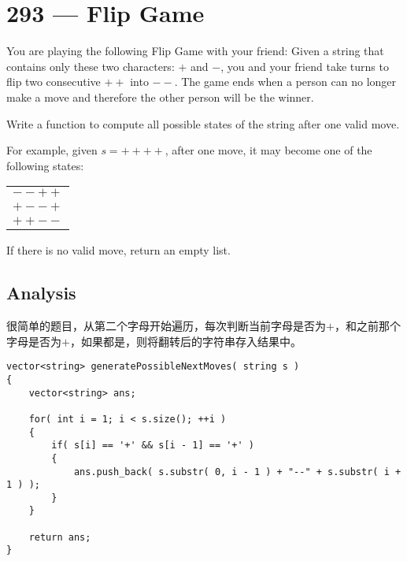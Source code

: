 \section{293 --- Flip Game }
You are playing the following Flip Game with your friend: Given a string that contains only these two characters: $+$ and $-$, you and your friend take turns to flip two consecutive $++$ into $--$. The game ends when a person can no longer make a move and therefore the other person will be the winner.
\par
Write a function to compute all possible states of the string after one valid move.
\par
For example, given $s = ++++$, after one move, it may become one of the following states:
\begin{table}[H]
\begin{tabular}{c}
 $--++$\\
 $+--+$\\
 $++--$
\end{tabular}
\end{table}
If there is no valid move, return an empty list.
\subsection{Analysis}
很简单的题目，从第二个字母开始遍历，每次判断当前字母是否为$+$，和之前那个字母是否为$+$，如果都是，则将翻转后的字符串存入结果中。
\setcounter{lstlisting}{0}
\begin{lstlisting}[style=customc, caption={Loop}]
vector<string> generatePossibleNextMoves( string s )
{
    vector<string> ans;

    for( int i = 1; i < s.size(); ++i )
    {
        if( s[i] == '+' && s[i - 1] == '+' )
        {
            ans.push_back( s.substr( 0, i - 1 ) + "--" + s.substr( i + 1 ) );
        }
    }

    return ans;
}
\end{lstlisting}